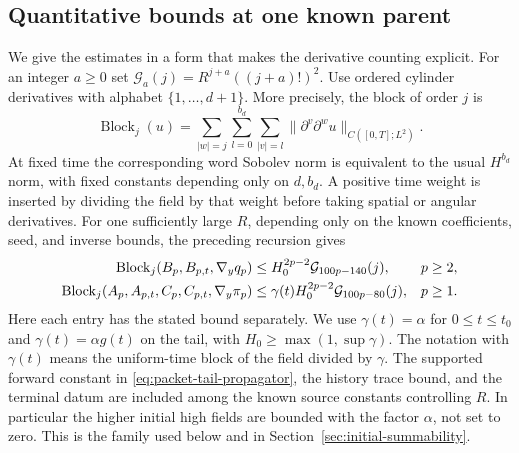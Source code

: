 \documentclass[11pt]{article}
\theoremstyle{definition}
\begin{document}
\subsection{Quantitative bounds at one known parent}
We give the estimates in a form that makes the derivative counting
explicit. For an integer $a\ge0$ set
$\mathcal G_a(j)=R^{j+a}((j+a)!)^2$.
Use ordered cylinder derivatives with alphabet $\{1,\ldots,d+1\}$.
More precisely, the block of order $j$ is
\[
 \operatorname{Block}_j(u)=
 \sum_{|w|=j}\sum_{l=0}^{b_d}\sum_{|v|=l}
     \|\partial^v\partial^w u\|_{C([0,T];L^2)}.
\]
At fixed time the corresponding word Sobolev norm is equivalent to the
usual $H^{b_d}$ norm, with fixed constants depending only on $d,b_d$.
A positive time weight is inserted by dividing the field by that
weight before taking spatial or angular derivatives. For one sufficiently
large $R$, depending only on the known coefficients, seed, and inverse
bounds, the preceding recursion gives
\begin{align}
 \operatorname{Block}_j(B_p,B_{p,t},\nabla_yq_p)
   &\le H_0^{2p-2}\mathcal G_{100p-140}(j),&&p\ge2,\notag\\
 \operatorname{Block}_j(A_p,A_{p,t},C_p,C_{p,t},\nabla_y\pi_p)
   &\le \gamma(t)H_0^{2p-2}\mathcal G_{100p-80}(j),&&p\ge1.
                                                        \label{eq:packet-grade-bounds}
\end{align}
Here each entry has the stated bound separately. We use
$\gamma(t)=\alpha$ for $0\le t\le t_0$ and
$\gamma(t)=\alpha g(t)$ on the tail, with
$H_0\ge\max(1,\sup\gamma)$. The notation with $\gamma(t)$ means the
uniform-time block of the field divided by $\gamma$. The supported
forward constant in \eqref{eq:packet-tail-propagator}, the history trace
bound, and the terminal datum are included among the known source
constants controlling $R$. In particular the higher initial high fields
are bounded with the factor $\alpha$, not set to zero. This is the
family used below and in Section~\ref{sec:initial-summability}.
\end{document}
